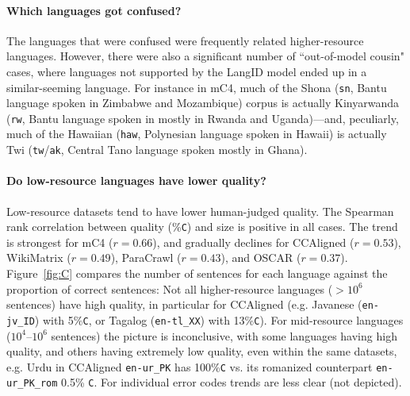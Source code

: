 \paragraph{Which languages got confused?} The languages that were confused were frequently related higher-resource languages. However, there were also a significant number of ``out-of-model cousin" cases, where languages not supported by the LangID model ended up in a similar-seeming language. For instance in mC4, much of the Shona (\texttt{sn}, Bantu language spoken in Zimbabwe and Mozambique) corpus is actually Kinyarwanda (\texttt{rw}, Bantu language spoken in mostly in Rwanda and Uganda)---and, peculiarly, much of the Hawaiian (\texttt{haw}, Polynesian language spoken in Hawaii) is actually Twi (\texttt{tw}/\texttt{ak}, Central Tano language spoken mostly in Ghana).




\paragraph{Do low-resource languages have lower quality?}
Low-resource datasets tend to have lower human-judged quality.
The Spearman rank correlation between quality (\%\texttt{C}) and size is positive in all cases. The trend is strongest for mC4 ($r=0.66$), %
and gradually declines for CCAligned ($r=0.53$), %
WikiMatrix ($r=0.49$), %
ParaCrawl ($r=0.43$), %
and OSCAR ($r=0.37$). %
Figure~\ref{fig:C} compares the number of sentences for each language against the proportion of correct sentences: %
Not all higher-resource languages ($>10^6$ sentences) have high quality, in particular for CCAligned (e.g. Javanese (\texttt{en\nobreakdash-jv\_ID}) with 5\%\texttt{C}, or Tagalog (\texttt{en\nobreakdash-tl\_XX}) with 13\%\texttt{C}). For mid-resource languages ($10^4$\nobreakdash--$10^6$ sentences) the picture is inconclusive, with some languages having high quality, and others having extremely low quality, even within the same datasets, e.g. Urdu in CCAligned \texttt{en-ur\_PK} has 100\%\texttt{C} vs. its romanized counterpart \texttt{en\nobreakdash-ur\_PK\_rom} 0.5\% \texttt{C}.
For individual error codes trends are less clear (not depicted).

